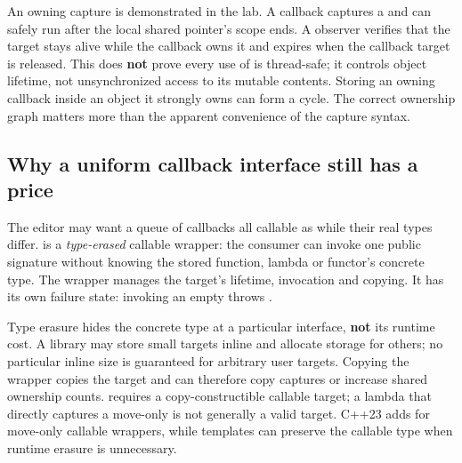 An owning capture is demonstrated in the lab. A callback captures a  and can safely run after the local shared pointer's scope ends. A  observer verifies that the target stays alive while the callback owns it and expires when the callback target is released. This does \textbf{not} prove every use of  is thread-safe; it controls object lifetime, not unsynchronized access to its mutable contents. Storing an owning callback inside an object it strongly owns can form a cycle. The correct ownership graph matters more than the apparent convenience of the capture syntax.

\subsection{Why a uniform callback interface still has a price}\label{05-engine-i-ch004-why-a-uniform-callback-interface-still-has-a-price}

\hypertarget{05-engine-i-ch004-why-a-uniform-callback-interface-still-has-a-price}{}

The editor may want a queue of callbacks all callable as  while their real types differ.  is a \emph{type-erased} callable wrapper: the consumer can invoke one public signature without knowing the stored function, lambda or functor's concrete type. The wrapper manages the target's lifetime, invocation and copying. It has its own failure state: invoking an empty  throws .

Type erasure hides the concrete type at a particular interface, \textbf{not} its runtime cost. A library may store small targets inline and allocate storage for others; no particular inline size is guaranteed for arbitrary user targets. Copying the wrapper copies the target and can therefore copy captures or increase shared ownership counts.  requires a copy-constructible callable target; a lambda that directly captures a move-only  is not generally a valid target. C++23 adds  for move-only callable wrappers, while templates can preserve the callable type when runtime erasure is unnecessary.

